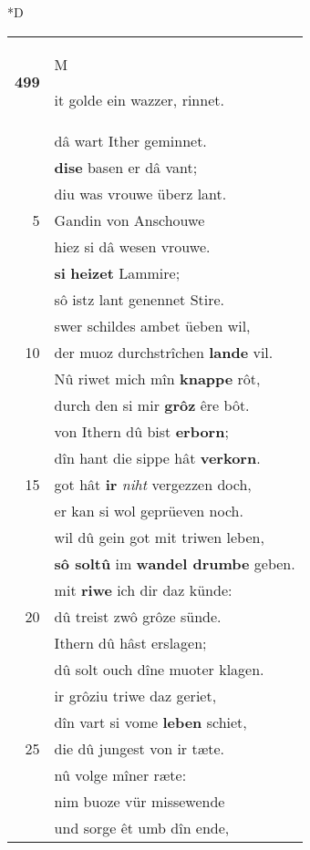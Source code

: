 \documentclass[8pt,a4paper,notitlepage]{article}
\begin{document}
\begin{table}[ht]
\begin{minipage}[t]{0.5\linewidth}
\small
\begin{center}*D
\end{center}
\begin{tabular}{rl}
\textbf{499} & \begin{large}M\end{large}it golde ein wazzer, rinnet.\\ 
 & dâ wart Ither geminnet.\\ 
 & \textbf{dise} basen er dâ vant;\\ 
 & diu was vrouwe überz lant.\\ 
5 & Gandin von Anschouwe\\ 
 & hiez si dâ wesen vrouwe.\\ 
 & \textbf{si} \textbf{heizet} Lammire;\\ 
 & sô istz lant genennet Stire.\\ 
 & swer schildes ambet üeben wil,\\ 
10 & der muoz durchstrîchen \textbf{lande} vil.\\ 
 & Nû riwet mich mîn \textbf{knappe} rôt,\\ 
 & durch den si mir \textbf{grôz} êre bôt.\\ 
 & von Ithern dû bist \textbf{erborn};\\ 
 & dîn hant die sippe hât \textbf{verkorn}.\\ 
15 & got hât \textbf{ir} \textit{niht} vergezzen doch,\\ 
 & er kan si wol geprüeven noch.\\ 
 & wil dû gein got mit triwen leben,\\ 
 & \textbf{sô soltû} im \textbf{wandel drumbe} geben.\\ 
 & mit \textbf{riwe} ich dir daz künde:\\ 
20 & dû treist zwô grôze sünde.\\ 
 & Ithern dû hâst erslagen;\\ 
 & dû solt ouch dîne muoter klagen.\\ 
 & ir grôziu triwe daz geriet,\\ 
 & dîn vart si vome \textbf{leben} schiet,\\ 
25 & die dû jungest von ir tæte.\\ 
 & nû volge mîner ræte:\\ 
 & nim buoze vür missewende\\ 
 & und sorge êt umb dîn ende,\\ 

\end{tabular}
\end{minipage}
\end{table}
\end{document}
